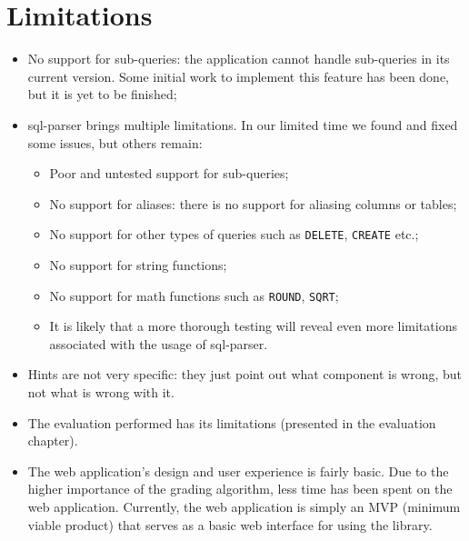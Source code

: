 \section{Limitations}
\begin{itemize}
    \item No support for sub-queries: the application cannot handle sub-queries in its current version. Some initial work to implement this feature has been done, but it is yet to be finished;
    \item sql-parser brings multiple limitations. In our limited time we found and fixed some issues, but others remain:
    \begin{itemize}
        \item Poor and untested support for sub-queries;
        \item No support for aliases: there is no support for aliasing columns or tables;
        \item No support for other types of queries such as \texttt{DELETE}, \texttt{CREATE} etc.;
        \item No support for string functions;
        \item No support for math functions such as \texttt{ROUND}, \texttt{SQRT};
        \item It is likely that a more thorough testing will reveal even more limitations associated with the usage of sql-parser.
    \end{itemize}
    \item Hints are not very specific: they just point out what component is wrong, but not what is wrong with it.
    \item The evaluation performed has its limitations (presented in the evaluation chapter).
    \item The web application's design and user experience is fairly basic. Due to the higher importance of the grading algorithm, less time has been spent on the web application. Currently, the web application is simply an MVP (minimum viable product) that serves as a basic web interface for using the library.
\end{itemize}

